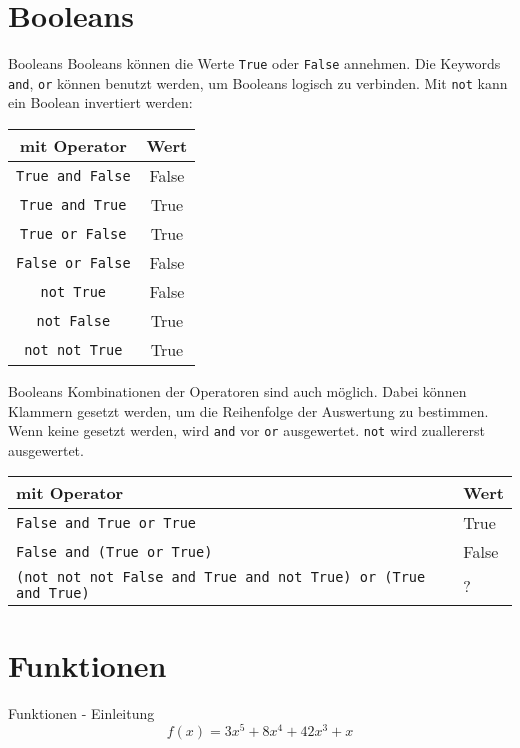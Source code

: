 \section{Booleans}
\begin{frame}{Booleans}
	Booleans können die Werte \alert{\texttt{True}} oder \alert{\texttt{False}} annehmen.
	\linebreak
	Die Keywords \alert{\texttt{and}}, \alert{\texttt{or}} können benutzt werden, um Booleans logisch zu verbinden.
	\linebreak
	Mit \alert{\texttt{not}} kann ein Boolean invertiert werden:

	\begin{center}
	\begin{tabular}{c | c}
		\hline\hline
		mit Operator & Wert \\
		\hline\hline
		\texttt{True and False} & False \\
		\texttt{True and True} & True \\
		\texttt{True or False} & True \\
		\texttt{False or False} & False \\
		\hline\hline
		\texttt{not True} & False \\
		\texttt{not False} & True \\
		\texttt{not not True} & True
	\end{tabular}
	\end{center}
\end{frame}

\begin{frame}{Booleans}
	Kombinationen der Operatoren sind auch möglich. Dabei können Klammern gesetzt werden, um die Reihenfolge der Auswertung zu bestimmen. Wenn keine gesetzt werden, wird \alert{\texttt{and}} vor \alert{\texttt{or}} ausgewertet. \alert{\texttt{not}} wird zuallererst ausgewertet.
	\begin{center}
		\begin{tabular}{m{8cm} | m{1cm}}
			\hline\hline
			mit Operator & Wert \\
			\hline\hline
			\texttt{False and True or True} & True \\
			\texttt{False and (True or True)} & False \\
			\texttt{(not not not False and True and not True) or (True and True)} & ?
		\end{tabular}
	\end{center}
\end{frame}


\section{Funktionen}
\begin{frame}{Funktionen - Einleitung}
		\Large $$ f(x) = 3x^5 + 8x^4 + 42x^3 + x $$
\end{frame}

